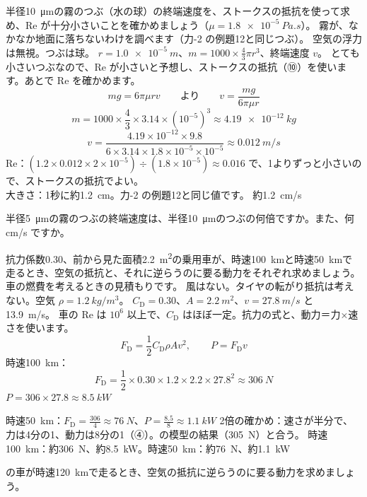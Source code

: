 \begin{phreidai}[霧つぶが落ちる速さ]\label{ph:力-15:ex5}
半径\qty{10}{\micro\metre}の霧のつぶ（水の球）の終端速度を、ストークスの抵抗を使って求め、Re が十分小さいことを確かめましょう（$\mu=\qty{1.8e-5}{Pa.s}$）。
\phbamen
霧が、なかなか地面に落ちないわけを調べます（力-2 の例題12と同じつぶ）。
\phmushi
空気の浮力は無視。つぶは球。
\phzu
$r=\qty{1.0e-5}{m}$、$m=1000\times\tfrac43\pi r^3$、終端速度 $v$。
\phriyu
とても小さいつぶなので、Re が小さいと予想し、ストークスの抵抗（⑩）を使います。あとで Re を確かめます。
\phtateru
\[mg=6\pi\mu rv\qquad\text{より}\qquad v=\frac{mg}{6\pi\mu r}\]
\phtoku
\[m=1000\times\frac{4}{3}\times3.14\times(10^{-5})^3\approx\qty{4.19e-12}{kg}\]
\[v=\frac{4.19\times10^{-12}\times9.8}{6\times3.14\times1.8\times10^{-5}\times10^{-5}}\approx\qty{0.012}{m/s}\]
\phtashikame
Re：$(1.2\times0.012\times2\times10^{-5})\div (1.8\times10^{-5})\approx0.016$ で、1よりずっと小さいので、ストークスの抵抗でよい。\\
大きさ：1秒に約\qty{1.2}{cm}。力-2 の例題12と同じ値です。
\kotae 約\qty{1.2}{cm/s}
\end{phreidai}
\begin{jibun}
半径\qty{5}{\micro\metre}の霧のつぶの終端速度は、半径\qty{10}{\micro\metre}のつぶの何倍ですか。また、何 cm/s ですか。
\end{jibun}

\begin{phreidai}[車の空気抵抗と動力]\label{ph:力-15:ex6}
抗力係数0.30、前から見た面積\qty{2.2}{m^2}の乗用車が、時速\qty{100}{km}と時速\qty{50}{km}で走るとき、空気の抵抗と、それに逆らうのに要る動力をそれぞれ求めましょう。
\phbamen
車の燃費を考えるときの見積もりです。
\phmushi
風はない。タイヤの転がり抵抗は考えない。空気 $\rho=\qty{1.2}{kg/m^3}$。
\phzu
$C_{\mathrm D}=0.30$、$A=\qty{2.2}{m^2}$、$v=\qty{27.8}{m/s}$ と\qty{13.9}{m/s}。
\phriyu
車の Re は $10^6$ 以上で、$C_{\mathrm D}$ はほぼ一定。抗力の式と、動力＝力×速さを使います。
\phtateru
\[F_{\mathrm D}=\frac{1}{2}C_{\mathrm D}\rho Av^2,\qquad P=F_{\mathrm D}v\]
\phtoku
時速\qty{100}{km}：
\[ F_{\mathrm D}=\frac12\times0.30\times1.2\times2.2\times27.8^2\approx\qty{306}{N} \]
$P=306\times27.8\approx\qty{8.5}{kW}$\par
時速\qty{50}{km}：$F_{\mathrm D}=\tfrac{306}{4}\approx\qty{76}{N}$、$P=\tfrac{8.5}{8}\approx\qty{1.1}{kW}$
\phtashikame
2倍の確かめ：速さが半分で、力は4分の1、動力は8分の1（④）。の模型の結果（\qty{305}{N}）と合う。
\kotae 時速\qty{100}{km}：約\qty{306}{N}、約\qty{8.5}{kW}。時速\qty{50}{km}：約\qty{76}{N}、約\qty{1.1}{kW}
\end{phreidai}
\begin{jibun}
の車が時速\qty{120}{km}で走るとき、空気の抵抗に逆らうのに要る動力を求めましょう。
\end{jibun}

